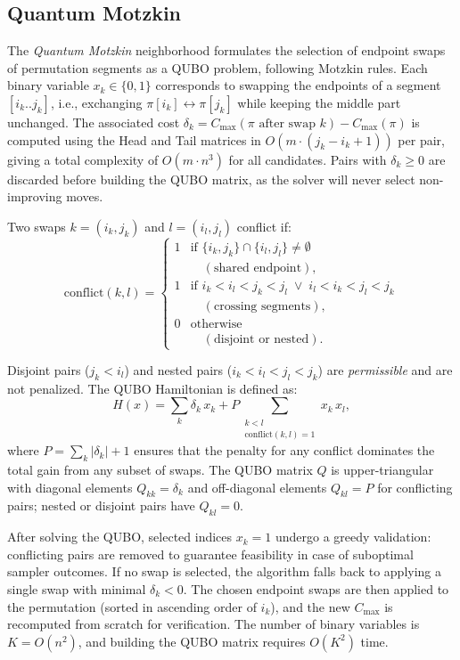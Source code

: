 \documentclass[10pt,twoside,twocolumn,a4paper]{article}
\begin{document}
\subsection{Quantum Motzkin}
The \emph{Quantum Motzkin} neighborhood formulates the selection of endpoint swaps of permutation segments as a QUBO problem, following Motzkin rules. Each binary variable $x_k \in \{0,1\}$ corresponds to swapping the endpoints of a segment $[i_k..j_k]$, i.e., exchanging $\pi[i_k] \leftrightarrow \pi[j_k]$ while keeping the middle part unchanged. The associated cost $\delta_k = C_{\max}(\pi \text{ after swap } k) - C_{\max}(\pi)$ is computed using the Head and Tail matrices in $O(m \cdot (j_k - i_k + 1))$ per pair, giving a total complexity of $O(m \cdot n^3)$ for all candidates. Pairs with $\delta_k \ge 0$ are discarded before building the QUBO matrix, as the solver will never select non-improving moves.

Two swaps $k = (i_k, j_k)$ and $l = (i_l, j_l)$ conflict if:
\begin{equation}
\mathrm{conflict}(k,l) =
\begin{cases}
1 & \text{if } \{i_k, j_k\} \cap \{i_l, j_l\} \neq \emptyset \\
  & \quad (\text{shared endpoint}), \\
1 & \text{if } i_k < i_l < j_k < j_l \;\vee\; i_l < i_k < j_l < j_k \\
  & \quad (\text{crossing segments}), \\
0 & \text{otherwise} \\
  & \quad (\text{disjoint or nested}).
\end{cases}
\end{equation}

Disjoint pairs ($j_k < i_l$) and nested pairs ($i_k < i_l < j_l < j_k$) are \emph{permissible} and are not penalized. The QUBO Hamiltonian is defined as:
\begin{equation}
    H(x) = \sum_{k} \delta_k\, x_k
          + P \!\sum_{\substack{k < l \\ \mathrm{conflict}(k,l)=1}} x_k\, x_l,
    \label{eq:qubo_motz}
\end{equation}
where $P = \sum_k |\delta_k| + 1$ ensures that the penalty for any conflict dominates the total gain from any subset of swaps. The QUBO matrix $Q$ is upper-triangular with diagonal elements $Q_{kk} = \delta_k$ and off-diagonal elements $Q_{kl} = P$ for conflicting pairs; nested or disjoint pairs have $Q_{kl} = 0$.

After solving the QUBO, selected indices $x_k = 1$ undergo a greedy validation: conflicting pairs are removed to guarantee feasibility in case of suboptimal sampler outcomes. If no swap is selected, the algorithm falls back to applying a single swap with minimal $\delta_k < 0$. The chosen endpoint swaps are then applied to the permutation (sorted in ascending order of $i_k$), and the new $C_{\max}$ is recomputed from scratch for verification. The number of binary variables is $K = O(n^2)$, and building the QUBO matrix requires $O(K^2)$ time.
\end{document}
